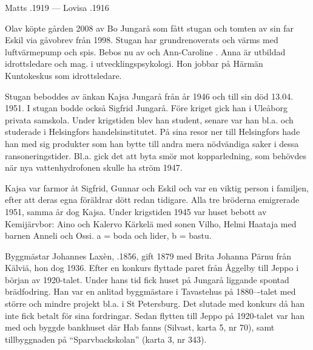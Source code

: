 Matts .1919  ---  Lovisa .1916


%


%
Olav köpte gården 2008 av Bo Jungarå som fått stugan och tomten av sin far Eskil via gåvobrev från 1998. Stugan har grundrenoverats och värms med luftvärmepump och spis. Bebos nu av  och Ann-Caroline . Anna är utbildad idrottsledare och mag. i utvecklingspsykologi. Hon jobbar på Härmän Kuntokeskus som idrottsledare.



%
Stugan  beboddes av änkan Kajsa Jungarå från år 1946 och till sin död 13.04. 1951. I stugan bodde också Sigfrid Jungarå. Före kriget gick han i Uleåborg privata samskola. Under krigstiden blev han student, senare var han bl.a. och studerade i Helsingfors handelsinstitutet. På sina resor ner till Helsingfors hade han med sig produkter som han bytte till andra mera nödvändiga saker i dessa ransoneringstider. Bl.a. gick det att byta smör mot kopparledning, som behövdes när nya vattenhydrofonen skulle ha ström 1947.

Kajsa var farmor åt Sigfrid, Gunnar och Eskil och var en viktig person i familjen, efter att deras egna föräldrar dött redan tidigare. Alla tre bröderna emigrerade 1951, samma år dog Kajsa. Under krigstiden 1945 var huset bebott av Kemijärvbor: Aino och Kalervo Kärkelä med sonen Vilho, Helmi Haataja med barnen Anneli och Ossi. a = boda och lider, b = bastu.


%
Byggmästar Johannes Laxèn, .1856, gift 1879 med Brita Johanna Pärnu från Kälviä, hon dog 1936. Efter en konkurs flyttade paret från Åggelby till Jeppo i början av 1920-talet. Under hans tid fick huset på Jungarå liggande spontad brädfodring. Han var en anlitad byggmästare i Tavastehus på 1880---talet med större och mindre projekt bl.a. i St Petersburg. Det slutade med konkurs då han inte fick betalt för sina fordringar. Sedan flytten till Jeppo på 1920-talet var han med och byggde bankhuset där Hab fanns (Silvast, karta 5, nr 70), samt tillbyggnaden på ``Sparvbackskolan'' (karta 3, nr 343).

